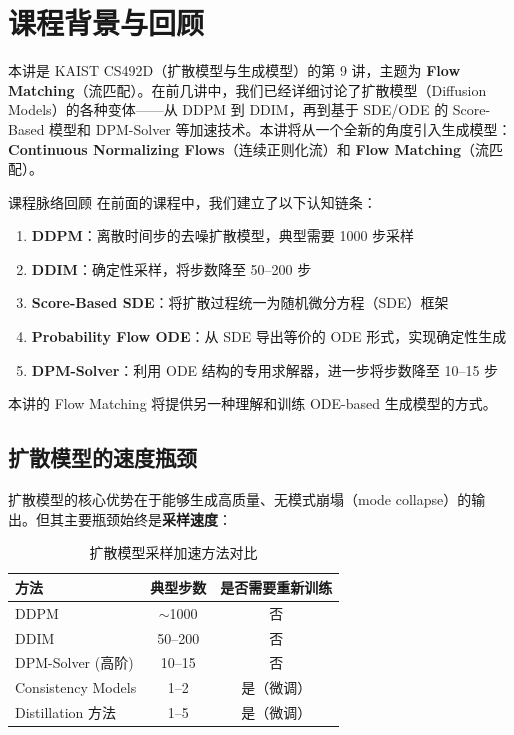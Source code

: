 \section{课程背景与回顾}

本讲是 KAIST CS492D（扩散模型与生成模型）的第 9 讲，主题为 \textbf{Flow Matching}（流匹配）。在前几讲中，我们已经详细讨论了扩散模型（Diffusion Models）的各种变体——从 DDPM 到 DDIM，再到基于 SDE/ODE 的 Score-Based 模型和 DPM-Solver 等加速技术。本讲将从一个全新的角度引入生成模型：\textbf{Continuous Normalizing Flows}（连续正则化流）和 \textbf{Flow Matching}（流匹配）。

\begin{knowledgebox}{课程脉络回顾}
在前面的课程中，我们建立了以下认知链条：
\begin{enumerate}
    \item \textbf{DDPM}：离散时间步的去噪扩散模型，典型需要 1000 步采样
    \item \textbf{DDIM}：确定性采样，将步数降至 50--200 步
    \item \textbf{Score-Based SDE}：将扩散过程统一为随机微分方程（SDE）框架
    \item \textbf{Probability Flow ODE}：从 SDE 导出等价的 ODE 形式，实现确定性生成
    \item \textbf{DPM-Solver}：利用 ODE 结构的专用求解器，进一步将步数降至 10--15 步
\end{enumerate}
本讲的 Flow Matching 将提供另一种理解和训练 ODE-based 生成模型的方式。
\end{knowledgebox}

\subsection{扩散模型的速度瓶颈}

扩散模型的核心优势在于能够生成高质量、无模式崩塌（mode collapse）的输出。但其主要瓶颈始终是\textbf{采样速度}：

\begin{table}[H]
\centering
\begin{tabular}{lcc}
\toprule
\textbf{方法} & \textbf{典型步数} & \textbf{是否需要重新训练} \\
\midrule
DDPM & $\sim$1000 & 否 \\
DDIM & 50--200 & 否 \\
DPM-Solver (高阶) & 10--15 & 否 \\
Consistency Models & 1--2 & 是（微调） \\
Distillation 方法 & 1--5 & 是（微调） \\
\bottomrule
\end{tabular}
\caption{扩散模型采样加速方法对比}
\end{table}

